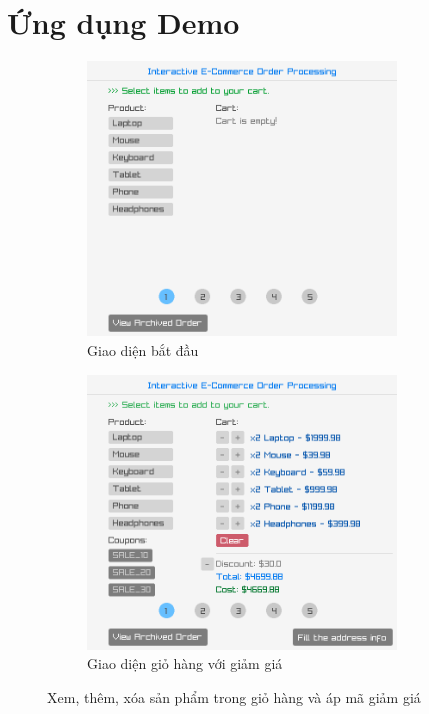 \section{Ứng dụng Demo}
\begin{figure}[!ht]
  \centering
  \begin{subfigure}{0.46\textwidth}
    \centering
    \includegraphics[width=0.9\textwidth]{../assets/screenshots/gui/cart_empty.png}
    \caption{Giao diện bắt đầu}
  \end{subfigure}
  \hfill
  \begin{subfigure}{0.46\textwidth}
    \centering
    \includegraphics[width=0.9\textwidth]{../assets/screenshots/gui/cart_with_discount.png}
    \caption{Giao diện giỏ hàng với giảm giá}
  \end{subfigure}
  \caption{Xem, thêm, xóa sản phẩm trong giỏ hàng và áp mã giảm giá}
\end{figure}
